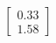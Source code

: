 \documentclass[preview]{standalone}
\begin{document}
\begin{align*}
\begin{bmatrix} 0.33 \\ 1.58 \end{bmatrix}
\end{align*}
\end{document}

